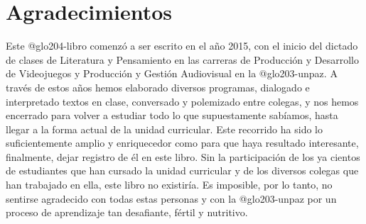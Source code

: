 \newif\ifPDF%
\newif\ifBNPDF%
\newif\ifEPUB%
\newif\ifHTML%
\newif\ifODT%

 \PDFtrue





\ifODT
\usepackage[unicode,hyperindex=true]{hyperref}
\else
	\ifPDF
	\usepackage[hyphenation,homeoarchy,draft,homeoarchywordcolor=yellow,homeoarchycharcolor=yellow]{impnattypo}
	\usepackage[allcolors=magenta,colorlinks]{hyperref}
	\usepackage{hyperxmp}
	
	\else
		\ifBNPDF
		\usepackage[cam,width=18truecm,height=25.5truecm,center]{crop}
		\usepackage[hidelinks]{hyperref}
		\usepackage{hyperxmp}
		
		\else
			\ifEPUB
			\usepackage[hyperindex=true,allcolors=magenta,colorlinks]{hyperref}
			\fi
		\fi
	\fi
\fi


\frontmatter

\ifEPUB%
	\ifdefined\HCode
	\phantomsection
	\addcontentsline{toc}{section}{Portada}
	\coverimage{./media/cover.png}
	\clearpage
	\fi
\fi

\ifPDF

\else
	\ifBNPDF
	
	\fi
\fi

\tableofcontents

\chapter{Agradecimientos}

Este \gls{@glo204-libro} comenzó a ser escrito en el año 2015, con el inicio del dictado de clases de Literatura y Pensamiento en las carreras de Producción y Desarrollo de Videojuegos y Producción y Gestión Audiovisual en la \gls{@glo203-unpaz}. A través de estos años hemos elaborado diversos programas, dia\-logado e interpretado textos en clase, conversado y polemizado entre colegas, y nos hemos encerrado para volver a estudiar todo lo que supuestamente sabíamos, hasta llegar a la forma actual de la unidad curricular. Este recorrido ha sido lo suficientemente amplio y enriquecedor como para que haya resultado interesante, finalmente, dejar registro de él en este libro. Sin la participación de los ya cientos de estudiantes que han cursado la unidad curricular y de los diversos colegas que han trabajado en ella, este libro no exis\-tiría. Es imposible, por lo tanto, no sentirse agradecido con todas estas personas y con la \gls{@glo203-unpaz} por un proceso de aprendizaje tan desafiante, fértil y nutritivo.

